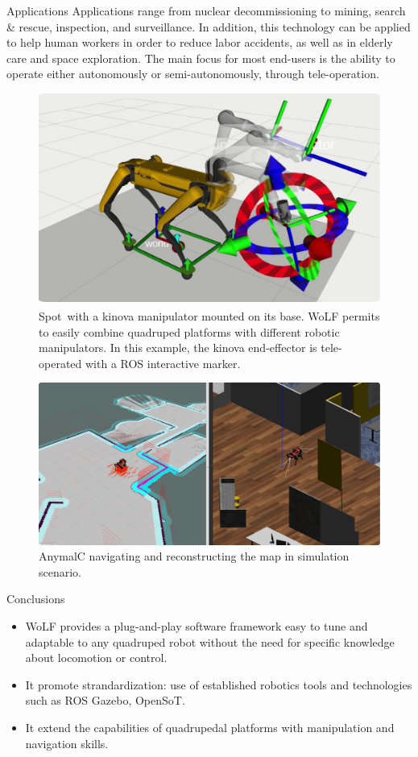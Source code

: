 	
\vspace{-20pt}	
\begin{myblock}{\large Applications} 
Applications range from nuclear decommissioning to mining, search \& rescue, inspection, and surveillance. In addition, this technology can be applied to help human workers
in order to reduce labor accidents, as well as in elderly
care and space exploration. The main focus for most end-users is the ability to operate either autonomously or semi-autonomously, through tele-operation.
%	
\begin{figure}[thb!]
	\centering
	\includegraphics[width=0.5\columnwidth]{images/spot_arm.pdf}
	\caption{Spot\textsuperscript\textregistered \  with a kinova manipulator mounted on its base. WoLF permits to easily combine quadruped platforms with different robotic manipulators. In this example, the kinova end-effector is tele-operated with a ROS interactive marker.}
	\label{fig:spot_arm}
\end{figure}
%
%
\begin{figure}[thb!]
	\centering
	\includegraphics[width=0.5\columnwidth]{images/anymalc_navigation.pdf}
	\caption{AnymalC navigating and reconstructing the map in simulation scenario.}
	\label{fig:anymalc_navigation}
\end{figure}
%
\end{myblock}

\begin{myblock}{{\large Conclusions}}
\begin{itemize}

	\item WoLF provides a plug-and-play software framework easy to tune and adaptable to any quadruped robot without the need for specific knowledge about locomotion or control.
	\item It promote strandardization: use of established robotics tools and technologies such as ROS Gazebo, OpenSoT.
	\item It extend the capabilities of quadrupedal platforms with manipulation and navigation skills.

\end{itemize}
	
\end{myblock} 
